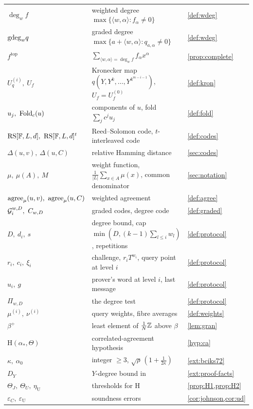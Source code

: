 {\begin{longtable}{@{}p{}p{}p{}@{}}
$\deg_wf$ & weighted degree $\max\{\langle w,\alpha\rangle:f_\alpha\ne0\}$ & \cref{def:wdeg}\\
$\mathrm{gdeg}_wq$ & graded degree $\max\{a+\langle w,\alpha\rangle:q_{a,\alpha}\ne0\}$ & \cref{def:wdeg}\\
$f^{\mathrm{top}}$ & $\sum_{\langle w,\alpha\rangle=\deg_wf}f_\alpha x^\alpha$ & \cref{prop:complete}\\
$U^{(i)}_q,\ U_f$ & Kronecker map $q(Y,Y^k,\dots,Y^{k^{m-i-1}})$, $U_f=U^{(0)}_f$ & \cref{def:kron}\\
$u_j,\ \Fold_c(u)$ & components of $u$, fold $\sum_jc^ju_j$ & \cref{def:fold}\\
$\RS[\F,L,d],\ \RS[\F,L,d]^t$ & Reed--Solomon code, $t$-interleaved code & \cref{def:codes}\\
$\Delta(u,v),\ \Delta(u,C)$ & relative Hamming distance & \cref{sec:codes}\\
$\mu,\ \mu(A),\ M$ & weight function, $\frac1{|L|}\sum_{x\in A}\mu(x)$, common denominator & \cref{sec:notation}\\
$\mathrm{agree}_\mu(u,v),\ \mathrm{agree}_\mu(u,C)$ & weighted agreement & \cref{def:agree}\\
$\Gc_i^{w,D},\ C_{w,D}$ & graded codes, degree code & \cref{def:graded}\\
$D,\ d_i,\ s$ & degree bound, cap $\min(D,(k-1)\sum_{l\le i}w_l)$, repetitions & \cref{def:protocol}\\
$r_i,\ c_i,\ \xi_i$ & challenge, $r_iT^{w_i}$, query point at level $i$ & \cref{def:protocol}\\
$u_i,\ g$ & prover's word at level $i$, last message & \cref{def:protocol}\\
$\Pi_{w,D}$ & the degree test & \cref{def:protocol}\\
$\mu^{(i)},\ \nu^{(i)}$ & query weights, fibre averages & \cref{def:weights}\\
$\beta^+$ & least element of $\frac1N\mathbb{Z}$ above $\beta$ & \cref{lem:gran}\\
$\mathrm H(\alpha_*,\Theta)$ & correlated-agreement hypothesis & \cref{hyp:ca}\\
$\kappa,\ \alpha_0$ & integer $\ge3$, $\sqrt\rho\,(1+\frac1{2\kappa})$ & \cref{ext:bciks72}\\
$D_Y$ & $Y$-degree bound in \cite[\S5]{BCIKS20} & \cref{ext:proof-facts}\\
$\Theta_J,\ \Theta_U,\ \eta_{\mathrm U}$ & thresholds for $\mathrm H$ & \cref{prop:H1,prop:H2}\\
$\varepsilon_C,\ \varepsilon_{\mathrm U}$ & soundness errors & \cref{cor:johnson,cor:ud}\\

\end{longtable}}
